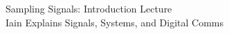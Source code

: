 \documentclass[preview]{standalone}
\begin{document}
\begin{center}
Sampling Signals: Introduction Lecture\\Iain Explains Signals, Systems, and Digital Comms
\end{center}
\end{document}
